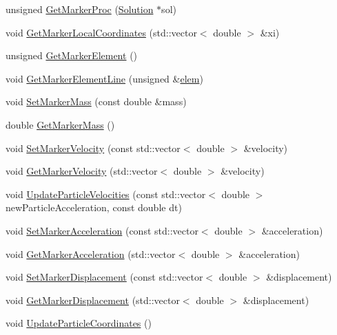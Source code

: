 \begin{DoxyCompactItemize}
unsigned \mbox{\hyperlink{classfemus_1_1_marker_a7b9cecab939da8a3bb0b7f325f8d4c82}{Get\+Marker\+Proc}} (\mbox{\hyperlink{classfemus_1_1_solution}{Solution}} $\ast$sol)
\item 
void \mbox{\hyperlink{classfemus_1_1_marker_a1c9ef5e8f53d5df14ed8877000015b22}{Get\+Marker\+Local\+Coordinates}} (std\+::vector$<$ double $>$ \&xi)
\item 
unsigned \mbox{\hyperlink{classfemus_1_1_marker_ade55a22365fdb7900488c2c6b4214a74}{Get\+Marker\+Element}} ()
\item 
void \mbox{\hyperlink{classfemus_1_1_marker_ae9e99af31667e4a355f90218c62870e7}{Get\+Marker\+Element\+Line}} (unsigned \&\mbox{\hyperlink{classfemus_1_1elem}{elem}})
\item 
void \mbox{\hyperlink{classfemus_1_1_marker_adcfbc791b5513bdcf0b6ef5463fda602}{Set\+Marker\+Mass}} (const double \&mass)
\item 
double \mbox{\hyperlink{classfemus_1_1_marker_afe519b2f7a2456df2d5055362db7c721}{Get\+Marker\+Mass}} ()
\item 
void \mbox{\hyperlink{classfemus_1_1_marker_a6e11f4c2da57d3d7b4da68515dc84edf}{Set\+Marker\+Velocity}} (const std\+::vector$<$ double $>$ \&velocity)
\item 
void \mbox{\hyperlink{classfemus_1_1_marker_a065c2d7a8aa6955769ef167e9a9bd115}{Get\+Marker\+Velocity}} (std\+::vector$<$ double $>$ \&velocity)
\item 
void \mbox{\hyperlink{classfemus_1_1_marker_a04c3ca5ff37c95221da70814b2d28675}{Update\+Particle\+Velocities}} (const std\+::vector$<$ double $>$ new\+Particle\+Acceleration, const double dt)
\item 
void \mbox{\hyperlink{classfemus_1_1_marker_a78ab2a9aeaf87a66d99758c0388ed63f}{Set\+Marker\+Acceleration}} (const std\+::vector$<$ double $>$ \&acceleration)
\item 
void \mbox{\hyperlink{classfemus_1_1_marker_af945ede868cb715f5a2c9af198bc7945}{Get\+Marker\+Acceleration}} (std\+::vector$<$ double $>$ \&acceleration)
\item 
void \mbox{\hyperlink{classfemus_1_1_marker_a6c5abe2e36749e4c032c152f9dfa5756}{Set\+Marker\+Displacement}} (const std\+::vector$<$ double $>$ \&displacement)
\item 
void \mbox{\hyperlink{classfemus_1_1_marker_ad971dd9e927960ba761b7f30824ee2a3}{Get\+Marker\+Displacement}} (std\+::vector$<$ double $>$ \&displacement)
\item 
void \mbox{\hyperlink{classfemus_1_1_marker_a66a336ffa0b9ebf859506c8c74745134}{Update\+Particle\+Coordinates}} ()

\end{DoxyCompactItemize}

